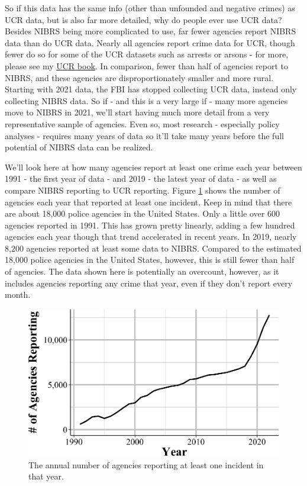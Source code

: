 \documentclass[
  12pt,
  openany]{book}
\begin{document}
So if this data has the same info (other than unfounded and negative crimes) as UCR data, but is also far more detailed, why do people ever use UCR data? Besides NIBRS being more complicated to use, far fewer agencies report NIBRS data than do UCR data. Nearly all agencies report crime data for UCR, though fewer do so for some of the UCR datasets such as arrests or arsons - for more, please see my \href{https://ucrbook.com/}{UCR book}. In comparison, fewer than half of agencies report to NIBRS, and these agencies are disproportionately smaller and more rural. Starting with 2021 data, the FBI has stopped collecting UCR data, instead only collecting NIBRS data. So if - and this is a very large if - many more agencies move to NIBRS in 2021, we'll start having much more detail from a very representative sample of agencies. Even so, most research - especially policy analyses - requires many years of data so it'll take many years before the full potential of NIBRS data can be realized.

We'll look here at how many agencies report at least one crime each year between 1991 - the first year of data - and 2019 - the latest year of data - as well as compare NIBRS reporting to UCR reporting. Figure \ref{fig:agenciesReporting} shows the number of agencies each year that reported at least one incident. Keep in mind that there are about 18,000 police agencies in the United States. Only a little over 600 agencies reported in 1991. This has grown pretty linearly, adding a few hundred agencies each year though that trend accelerated in recent years. In 2019, nearly 8,200 agencies reported at least some data to NIBRS. Compared to the estimated 18,000 police agencies in the United States, however, this is still fewer than half of agencies. The data shown here is potentially an overcount, however, as it includes agencies reporting any crime that year, even if they don't report every month.

\begin{figure}

{\centering \includegraphics[width=0.9\linewidth]{11_nibrs_general_files/figure-latex/agenciesReporting-1} 

}

\caption{The annual number of agencies reporting at least one incident in that year.}\label{fig:agenciesReporting}
\end{figure}
\end{document}

